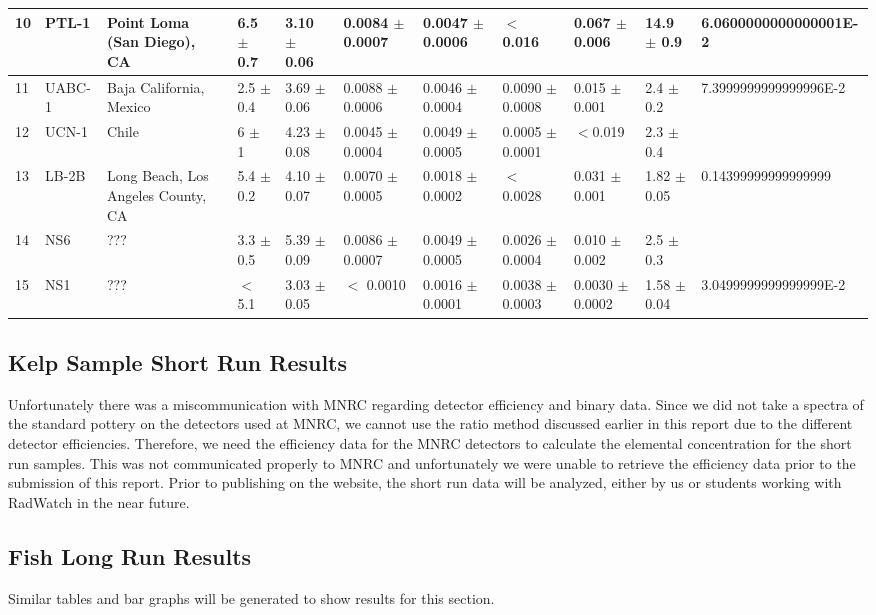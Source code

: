 \documentclass[]{article}
\begin{document}
\begin{table}[h]
{\begin{tabular}{ | l | l | l | l | l | l | l | l | l | l | l | }
	10 & PTL-1 & Point Loma (San Diego), CA & 6.5 $\pm$ 0.7 & 3.10 $\pm$ 0.06 & 0.0084 $\pm$ 0.0007 & 0.0047 $\pm$ 0.0006 & $<$ 0.016  & 0.067 $\pm$ 0.006 & 14.9 $\pm$ 0.9 & 6.0600000000000001E-2 \\ \hline
	11 & UABC-1 & Baja California, Mexico & 2.5 $\pm$ 0.4 & 3.69 $\pm$ 0.06 & 0.0088 $\pm$ 0.0006 & 0.0046 $\pm$ 0.0004 & 0.0090 $\pm$ 0.0008 & 0.015 $\pm$ 0.001 & 2.4 $\pm$ 0.2 & 7.3999999999999996E-2 \\ \hline
	12 & UCN-1 & Chile & 6 $\pm$ 1 & 4.23 $\pm$ 0.08 & 0.0045 $\pm$ 0.0004 & 0.0049 $\pm$ 0.0005 & 0.0005 $\pm$ 0.0001 & $<$0.019 & 2.3 $\pm$ 0.4 &  \\ \hline
	13 & LB-2B & Long Beach, Los Angeles County, CA & 5.4 $\pm$ 0.2 & 4.10 $\pm$ 0.07 & 0.0070 $\pm$ 0.0005 & 0.0018 $\pm$ 0.0002 & $<$ 0.0028 & 0.031 $\pm$ 0.001 & 1.82 $\pm$ 0.05 & 0.14399999999999999 \\ \hline
	14 & NS6 & ??? & 3.3 $\pm$ 0.5 & 5.39 $\pm$ 0.09 & 0.0086 $\pm$ 0.0007 & 0.0049 $\pm$ 0.0005 & 0.0026 $\pm$ 0.0004 & 0.010 $\pm$ 0.002 & 2.5 $\pm$ 0.3 &  \\ \hline
	15 & NS1 & ??? & $<$5.1 & 3.03 $\pm$ 0.05 & $<$ 0.0010 & 0.0016 $\pm$ 0.0001 & 0.0038 $\pm$ 0.0003 & 0.0030 $\pm$ 0.0002 & 1.58 $\pm$ 0.04 & 3.0499999999999999E-2 \\ \hline
\end{tabular}

}
\end{table}


\subsection{Kelp Sample Short Run Results}
Unfortunately there was a miscommunication with MNRC regarding detector efficiency and binary data. Since we did not take a spectra of the standard pottery on the detectors used at MNRC, we cannot use the ratio method discussed earlier in this report due to the different detector efficiencies. Therefore, we need the efficiency data for the MNRC detectors to calculate the elemental concentration for the short run samples. This was not communicated properly to MNRC and unfortunately we were unable to retrieve the efficiency data prior to the submission of this report. Prior to publishing on the website, the short run data will be analyzed, either by us or students working with RadWatch in the near future.

\subsection{Fish Long Run Results}
Similar tables and bar graphs will be generated to show results for this section.
\end{document}
